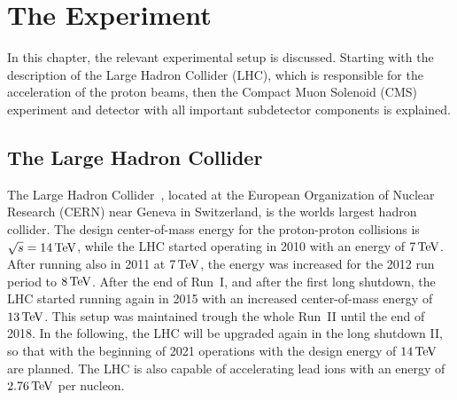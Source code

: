 \chapter{The Experiment}\label{chap:experiment}
In this chapter, the relevant experimental setup is discussed. Starting with the description of the Large Hadron Collider (LHC), which is responsible for the acceleration of the proton beams, then the Compact Muon Solenoid (CMS) experiment and detector with all important subdetector components is explained.
\section{The Large Hadron Collider}\label{sec:LHC}
The Large Hadron Collider~\cite{LHC1,LHC2}, located at the European Organization of Nuclear Research (CERN) near Geneva in Switzerland, is the worlds largest hadron collider. The design center-of-mass energy for the proton-proton collisions is $\sqrt{s}=14\,\text{Te\hspace{-.08em}V}$, while the LHC started operating in 2010 with an energy of $7\,\text{Te\hspace{-.08em}V}$. After running also in 2011 at $7\,\text{Te\hspace{-.08em}V}$, the energy was increased for the 2012 run period to $8\,\text{Te\hspace{-.08em}V}$. After the end of Run~I, and after the first long shutdown, the LHC started running again in 2015 with an increased center-of-mass energy of $13\,\text{Te\hspace{-.08em}V}$. This setup was maintained trough the whole Run~II until the end of 2018. In the following, the LHC will be upgraded again in the long shutdown II, so that with the beginning of 2021 operations with the design energy of $14\,\text{Te\hspace{-.08em}V}$ are planned.
The LHC is also capable of accelerating lead ions with an energy of $2.76\,\text{Te\hspace{-.08em}V}$ per nucleon.\\
